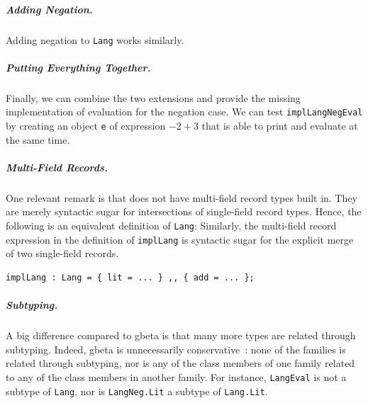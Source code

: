 \subparagraph{Adding Negation.}
Adding negation to \lstinline{Lang} works similarly.



\subparagraph{Putting Everything Together.}
Finally, we can combine the two extensions and provide the missing
implementation of evaluation for the negation case.
We can test \lstinline{implLangNegEval} by creating an object \lstinline{e} of expression $-2 + 3$ that is able to print and evaluate at the same time.



\subparagraph{Multi-Field Records.} One relevant remark is that
\name does not have multi-field record types built in. They are merely syntactic
sugar for intersections of single-field record types. Hence, the following is an
equivalent definition of \lstinline{Lang}:
Similarly, the multi-field record expression in the definition of
\lstinline{implLang} is syntactic sugar for the explicit merge of two
single-field records.
\begin{lstlisting}
implLang : Lang = { lit = ... } ,, { add = ... };
\end{lstlisting}

\subparagraph{Subtyping.}
A big difference compared to gbeta is that many more \name types are related through
subtyping. Indeed, gbeta is unnecessarily conservative~\cite{ernst_hoh}: none of the families is related
through subtyping, nor is any of the class members of one family related to any
of the class members in another family. For instance, \lstinline{LangEval} is
not a subtype of \lstinline{Lang}, nor is \lstinline{LangNeg.Lit} a subtype
of \lstinline{Lang.Lit}.

